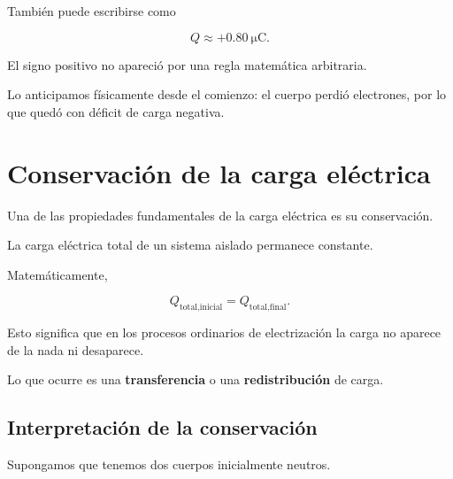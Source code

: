 También puede escribirse como

\begin{equation}
    \boxed{
    Q\approx+\SI{0.80}{\micro\coulomb}
    }.
\end{equation}

\begin{interpretacion}
El signo positivo no apareció por una regla matemática arbitraria.

Lo anticipamos físicamente desde el comienzo: el cuerpo perdió electrones,
por lo que quedó con déficit de carga negativa.
\end{interpretacion}



\section{Conservación de la carga eléctrica}

Una de las propiedades fundamentales de la carga eléctrica es su
conservación.

\begin{principio}
La carga eléctrica total de un sistema aislado permanece constante.
\end{principio}

Matemáticamente,

\begin{equation}
    \boxed{
    Q_{\text{total,inicial}}
    =
    Q_{\text{total,final}}
    }.
    \label{eq:conservacion_carga}
\end{equation}

Esto significa que en los procesos ordinarios de electrización la carga no
aparece de la nada ni desaparece.

Lo que ocurre es una \textbf{transferencia} o una
\textbf{redistribución} de carga.



\subsection{Interpretación de la conservación}

Supongamos que tenemos dos cuerpos inicialmente neutros.

